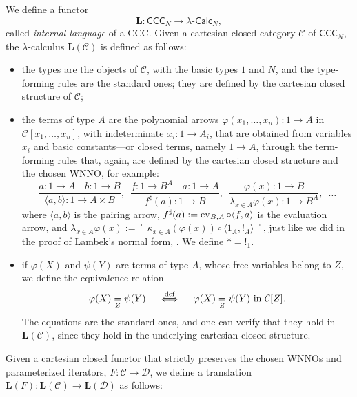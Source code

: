 \begin{example}\label{idx:internal-language}
    We define a functor
    \[ \mathbf L : \mathsf{CCC}_N \to \lambda\text{-}\mathsf{Calc}_N, \]
    called \emph{internal language} of a CCC. Given a cartesian closed category $\mathcal C$ of $\mathsf{CCC}_N$, the $\lambda$-calculus $\mathbf L(\mathcal C)$ is defined as follows:
    \begin{itemize}
        \item the types are the objects of $\mathcal C$, with the basic types $1$ and $N$, and the type-forming rules are the standard ones; they are defined by the cartesian closed structure of $\mathcal C$;
        \item the terms of type $A$ are the polynomial arrows $\varphi(x_1,\dots,x_n) : 1 \to A$ in $\mathcal C[x_1,\dots,x_n]$, with indeterminate $x_i : 1 \to A_i$, that are obtained from variables $x_i$ and
        basic constants---or closed terms, namely $1 \to A$, through the term-forming rules that, again, are defined by the cartesian closed structure and the chosen WNNO, for example:
        \[ \frac{a : 1 \to A \quad b : 1 \to B}{\langle a,b\rangle : 1 \to A \times B}, \enspace \frac{f : 1 \to B^A \quad a : 1 \to A}{f^\sharp(a) : 1 \to B}, \enspace \frac{\varphi(x) : 1 \to B}{\lambda_{x \in A} \varphi(x) : 1 \to B^A}, \enspace \ldots \]
        where $\langle a, b \rangle$ is the pairing arrow, $f^\sharp(a) := \operatorname{ev}_{B,A}\circ \langle f,a \rangle$ is the evaluation arrow, and $\lambda_{x \in A} \varphi(x) := \ulcorner \kappa_{x \in A}(\varphi(x)) \circ \langle 1_A, !_A \rangle \urcorner$,
        just like we did in the proof of Lambek's normal form, . We define $* = !_1$.
        \item if $\varphi(X)$ and $\psi(Y)$ are terms of type $A$, whose free variables belong to $Z$, we define the equivalence relation
        \[ \varphi(X) \underset{Z}{=} \psi(Y) \quad \overset{\textnormal{def}}{\iff} \quad \varphi(X) \underset{Z}{=} \psi(Y) \text{ in } \mathcal C[Z]. \]
        The equations are the standard ones, and one can verify that they hold in $\mathbf L(\mathcal C)$, since they hold in the underlying cartesian closed structure.
    \end{itemize}
    Given a cartesian closed functor that strictly preserves the chosen WNNOs and parameterized iterators, $F : \mathcal C \to \mathcal D$, we define a translation $\mathbf L(F) : \mathbf L(\mathcal C) \to \mathbf L(\mathcal D)$ as follows:
    \begin{itemize}

\end{itemize}
\end{example}
